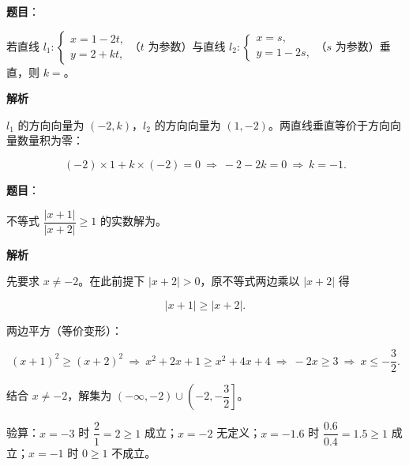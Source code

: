 \begin{answer}

\textbf{题目}：

若直线 $l_1:\begin{cases}x=1-2t,\\ y=2+kt,\end{cases}$（$t$ 为参数）与直线 $l_2:\begin{cases}x=s,\\ y=1-2s,\end{cases}$（$s$ 为参数）垂直，则 $k=$\gkblank{}。

\textbf{解析}

$l_1$ 的方向向量为 $(-2,k)$，$l_2$ 的方向向量为 $(1,-2)$。两直线垂直等价于方向向量数量积为零：

\nopagebreak[4]
\[(-2)\times1+k\times(-2)=0\ \Longrightarrow\ -2-2k=0\ \Longrightarrow\ k=-1.\]


\end{answer}
\begin{answer}

\textbf{题目}：

不等式 $\dfrac{|x+1|}{|x+2|}\geqslant1$ 的实数解为\gkblank{}。

\textbf{解析}

先要求 $x\neq-2$。在此前提下 $|x+2|>0$，原不等式两边乘以 $|x+2|$ 得

\nopagebreak[4]
\[|x+1|\geqslant|x+2|.\]

两边平方（等价变形）：

\nopagebreak[4]
\[(x+1)^2\geqslant(x+2)^2\ \Longrightarrow\ x^2+2x+1\geqslant x^2+4x+4\ \Longrightarrow\ -2x\geqslant3\ \Longrightarrow\ x\leqslant-\frac32.\]

结合 $x\neq-2$，解集为 $(-\infty,-2)\cup\left(-2,-\dfrac32\right]$。

验算：$x=-3$ 时 $\dfrac21=2\geqslant1$ 成立；$x=-2$ 无定义；$x=-1.6$ 时 $\dfrac{0.6}{0.4}=1.5\geqslant1$ 成立；$x=-1$ 时 $0\geqslant1$ 不成立。

\gkanswer{答案：$(-\infty,-2)\cup\left(-2,-\dfrac32\right]$。}

\end{answer}
